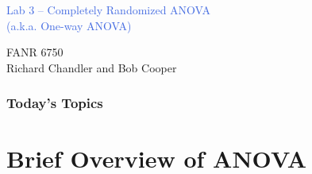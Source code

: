 \documentclass[color=usenames,dvipsnames]{beamer}\usepackage[]{graphicx}\usepackage[]{color}
\begin{document}



\begin{frame}[plain]
  \LARGE
  \centering \par
  \textcolor{RoyalBlue}{Lab 3 -- Completely Randomized ANOVA \\
  (a.k.a. One-way ANOVA)} \par
  \vspace{1cm}
  FANR 6750 \\
  \vfill
  \large
  Richard Chandler and Bob Cooper
\end{frame}








\begin{frame}[plain]
  \frametitle{Today's Topics}
  \LARGE
\end{frame}



\section{Brief Overview of ANOVA}
\end{document}
